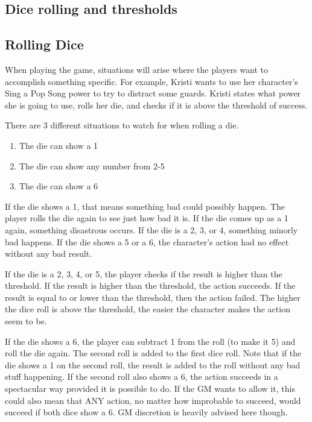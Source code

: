\begin{flushleft}

\chapter{Dice rolling and thresholds}

\section*{Rolling Dice}

When playing the game, situations will arise where the players want to
accomplish something specific. For example, Kristi wants to use her character's
Sing a Pop Song power to try to distract some guards. Kristi states what power
she is going to use, rolls her die, and checks if it is above the
threshold of success.

There are 3 different situations to watch for when rolling a die.

\begin{enumerate}
    \item{The die can show a 1}
    \item{The die can show any number from 2-5}
    \item{The die can show a 6}
\end{enumerate}

If the die shows a 1, that means something bad could possibly happen. The
player rolls the die again to see just how bad it is. If the die comes up as a
1 again, something disastrous occurs. If the die is a 2, 3, or 4, something
minorly bad happens. If the die shows a 5 or a 6, the character's action
had no effect without any bad result.

If the die is a 2, 3, 4, or 5, the player checks if the result is higher than
the threshold. If the result is higher than the threshold, the action succeeds.
If the result is equal to or lower than the threshold, then the action failed.
The higher the dice roll is above the threshold, the easier the character makes
the action seem to be.

If the die shows a 6, the player can subtract 1 from the roll (to make it 5)
and roll the die again. The second roll is added to the first dice roll. Note
that if the die shows a 1 on the second roll, the result is added to the roll
without any bad stuff happening. If the second roll also shows a 6, the action
succeeds in a spectacular way provided it is possible to do.
If the GM wants to allow it, this could also mean that ANY action, no matter
how improbable to succeed, would succeed if both dice show a 6. GM discretion
is heavily advised here though.


\end{flushleft}
